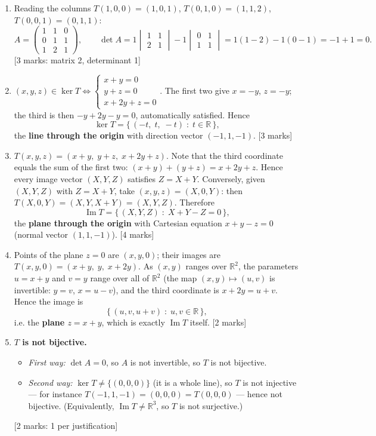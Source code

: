 \documentclass[11pt]{article}
\begin{document}
\begin{corrige}
\begin{enumerate}
\item Reading the columns $T(1,0,0)=(1,0,1)$, $T(0,1,0)=(1,1,2)$, $T(0,0,1)=(0,1,1)$:
\[ A=\begin{pmatrix} 1 & 1 & 0 \\ 0 & 1 & 1 \\ 1 & 2 & 1 \end{pmatrix},\qquad \det A=1\begin{vmatrix}1&1\\2&1\end{vmatrix}-1\begin{vmatrix}0&1\\1&1\end{vmatrix}=1(1-2)-1(0-1)=-1+1=0. \]
\hfill [3 marks: matrix 2, determinant 1]
\item $(x,y,z)\in\ker T\iff \begin{cases} x+y=0 \\ y+z=0 \\ x+2y+z=0 \end{cases}$. The first two give $x=-y$, $z=-y$; the third is then $-y+2y-y=0$, automatically satisfied. Hence
\[ \ker T=\{\,(-t,\;t,\;-t)\;:\;t\in\mathbb{R}\,\}, \]
the \textbf{line through the origin} with direction vector $(-1,1,-1)$. \hfill [3 marks]
\item $T(x,y,z)=(x+y,\;y+z,\;x+2y+z)$. Note that the third coordinate equals the sum of the first two: $(x+y)+(y+z)=x+2y+z$. Hence every image vector $(X,Y,Z)$ satisfies $Z=X+Y$. Conversely, given $(X,Y,Z)$ with $Z=X+Y$, take $(x,y,z)=(X,0,Y)$: then $T(X,0,Y)=(X,Y,X+Y)=(X,Y,Z)$. Therefore
\[ \operatorname{Im}T=\{\,(X,Y,Z)\;:\;X+Y-Z=0\,\}, \]
the \textbf{plane through the origin} with Cartesian equation $x+y-z=0$ (normal vector $(1,1,-1)$). \hfill [4 marks]
\item Points of the plane $z=0$ are $(x,y,0)$; their images are $T(x,y,0)=(x+y,\;y,\;x+2y)$. As $(x,y)$ ranges over $\mathbb{R}^{2}$, the parameters $u=x+y$ and $v=y$ range over all of $\mathbb{R}^{2}$ (the map $(x,y)\mapsto(u,v)$ is invertible: $y=v$, $x=u-v$), and the third coordinate is $x+2y=u+v$. Hence the image is
\[ \{\,(u,v,u+v)\;:\;u,v\in\mathbb{R}\,\}, \]
i.e. the \textbf{plane $z=x+y$}, which is exactly $\operatorname{Im}T$ itself. \hfill [2 marks]
\item \textbf{$T$ is not bijective.}
\begin{itemize}
\item \emph{First way:} $\det A=0$, so $A$ is not invertible, so $T$ is not bijective.
\item \emph{Second way:} $\ker T\neq\{(0,0,0)\}$ (it is a whole line), so $T$ is not injective — for instance $T(-1,1,-1)=(0,0,0)=T(0,0,0)$ — hence not bijective. (Equivalently, $\operatorname{Im}T\neq\mathbb{R}^{3}$, so $T$ is not surjective.)
\end{itemize}
\hfill [2 marks: 1 per justification]
\end{enumerate}
\end{corrige}
\end{document}
